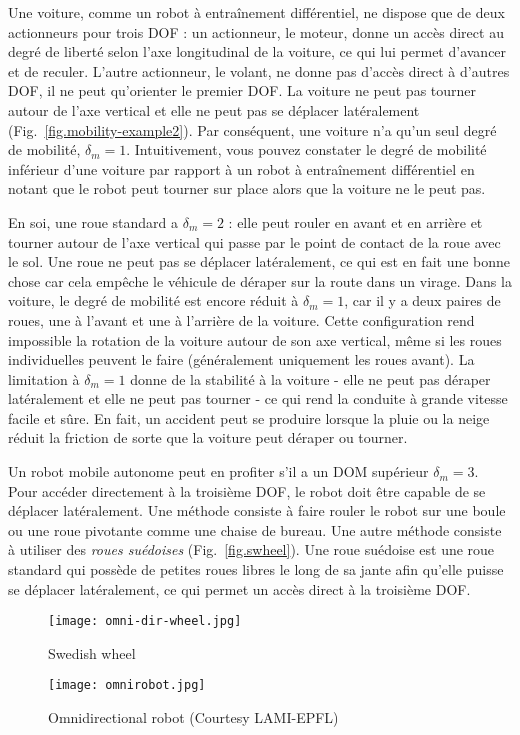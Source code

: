 {Une voiture, comme un robot à entraînement différentiel, ne dispose que de deux actionneurs pour trois DOF : un actionneur, le moteur, donne un accès direct au degré de liberté selon l'axe longitudinal de la voiture, ce qui lui permet d'avancer et de reculer. L'autre actionneur, le volant, ne donne pas d'accès direct à d'autres DOF, il ne peut qu'orienter le premier DOF. La voiture ne peut pas tourner autour de l'axe vertical et elle ne peut pas se déplacer latéralement (Fig.~\ref{fig.mobility-example2}). Par conséquent, une voiture n'a qu'un seul degré de mobilité, $\delta_m = 1$. Intuitivement, vous pouvez constater le degré de mobilité inférieur d'une voiture par rapport à un robot à entraînement différentiel en notant que le robot peut tourner sur place alors que la voiture ne le peut pas.

En soi, une roue standard a $\delta_m=2$ : elle peut rouler en avant et en arrière et tourner autour de l'axe vertical qui passe par le point de contact de la roue avec le sol. Une roue ne peut pas se déplacer latéralement, ce qui est en fait une bonne chose car cela empêche le véhicule de déraper sur la route dans un virage. Dans la voiture, le degré de mobilité est encore réduit à $\delta_m=1$, car il y a deux paires de roues, une à l'avant et une à l'arrière de la voiture. Cette configuration rend impossible la rotation de la voiture autour de son axe vertical, même si les roues individuelles peuvent le faire (généralement uniquement les roues avant). La limitation à $\delta_m=1$ donne de la stabilité à la voiture - elle ne peut pas déraper latéralement et elle ne peut pas tourner - ce qui rend la conduite à grande vitesse facile et sûre. En fait, un accident peut se produire lorsque la pluie ou la neige réduit la friction de sorte que la voiture peut déraper ou tourner.

Un robot mobile autonome peut en profiter s'il a un DOM supérieur $\delta_m = 3$. Pour accéder directement à la troisième DOF, le robot doit être capable de se déplacer latéralement. Une méthode consiste à faire rouler le robot sur une boule ou une roue pivotante comme une chaise de bureau. Une autre méthode consiste à utiliser des \emph{roues suédoises} (Fig.~\ref{fig.swheel}). Une roue suédoise est une roue standard qui possède de petites roues libres le long de sa jante afin qu'elle puisse se déplacer latéralement, ce qui permet un accès direct à la troisième DOF.

\begin{figure}
\begin{minipage}{.45\textwidth}
\texttt{[image: omni-dir-wheel.jpg]}
\caption{Swedish wheel}\label{fig.swheel}
\end{minipage}
\hspace{\fill}
\begin{minipage}{.45\textwidth}\texttt{[image: omnirobot.jpg]}
\caption{Omnidirectional robot (Courtesy LAMI-EPFL)}\label{fig.omni-robot}
\end{minipage}
\end{figure}

}
